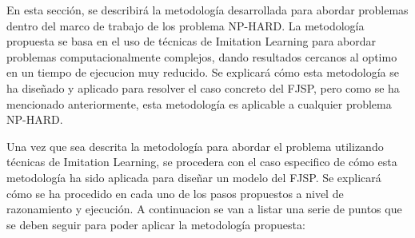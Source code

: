 En esta sección, se describirá la metodología desarrollada para abordar problemas 
dentro del marco de trabajo de los problema NP-HARD. La metodología propuesta se 
basa en el uso de técnicas de Imitation Learning para abordar problemas computacionalmente
complejos, dando resultados cercanos al optimo en un tiempo de ejecucion muy reducido. 
Se explicará cómo esta metodología se ha diseñado y aplicado para resolver el caso concreto 
del FJSP, pero como se ha mencionado anteriormente, esta metodología es aplicable a cualquier
problema NP-HARD.\medskip

Una vez que sea descrita la metodología para abordar el problema utilizando 
técnicas de Imitation Learning, se procedera con el caso especifico de cómo esta metodología 
ha sido aplicada para diseñar un modelo del FJSP. Se explicará cómo se ha procedido en cada uno 
de los pasos propuestos a nivel de razonamiento y ejecución. A continuacion se van a listar una 
serie de puntos que se deben seguir para poder aplicar la metodología propuesta:

